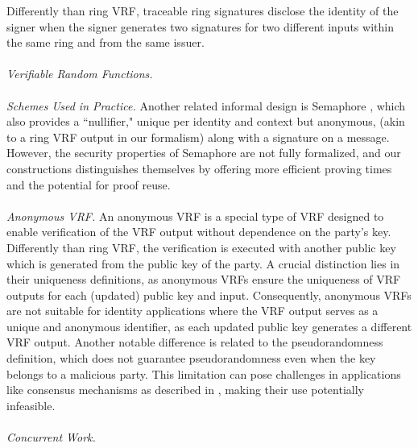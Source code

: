 Differently than ring VRF, traceable ring signatures  disclose the identity of the signer when the signer generates two signatures for two different inputs within the same ring and from the same issuer.
\\\\
\noindent\textit{Verifiable Random Functions.} 
\\\\
\noindent\textit{Schemes Used in Practice.} Another related informal design is Semaphore \cite{Semaphore}, which also provides a ``nullifier," unique per identity and context but anonymous, (akin to a ring VRF output in our formalism) along with a signature on a message. However, the security properties of Semaphore are not fully formalized, and our constructions distinguishes themselves by offering more efficient proving times and the potential for proof reuse. 
\\\\
\noindent\textit{Anonymous VRF.}  An anonymous VRF \cite{anonymousVRF} is a special type of VRF designed to enable verification of the VRF output without dependence on the party's key.  Differently than ring VRF, the verification is executed with another public key which is generated from the public key of the party.  A crucial distinction lies in their  uniqueness definitions, as anonymous VRFs ensure the uniqueness of VRF outputs for each (updated) public key and input. Consequently, anonymous VRFs are not suitable for identity applications where the VRF output serves as a unique and anonymous identifier, as each updated public key generates a different VRF output.
Another notable difference is related to the pseudorandomness definition, which does not guarantee pseudorandomness even when the key belongs to a malicious party. This limitation can pose challenges in applications like consensus mechanisms as described in \cite{anonymousVRF}, making their use potentially infeasible.
\\\\
\noindent\textit{Concurrent Work.} 
